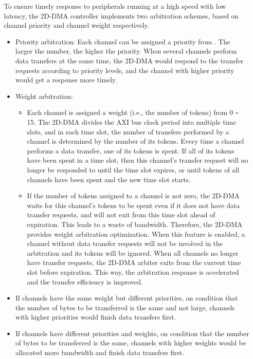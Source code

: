 \documentclass[main\_\_EN.tex]{subfiles}
\begin{document}
To ensure timely response to peripherals running at a high speed with low latency, the 2D-DMA controller implements two arbitration schemes, based on channel priority and channel weight respectively.

\begin{itemize}
    \item Priority arbitration: Each channel can be assigned a priority from . The larger the number, the higher the priority. When several channels perform data transfers at the same time, the 2D-DMA would respond to the transfer requests according to priority levels, and the channel with higher priority would get a response more timely.
    \item Weight arbitration:
        \begin{itemize}
            \item Each channel is assigned a weight (i.e., the number of tokens) from 0 \verb+~+ 15. The 2D-DMA divides the AXI bus clock period into multiple time slots, and in each time slot, the number of transfers performed by a channel is determined by the number of its tokens. Every time a channel performs a data transfer, one of its tokens is spent. If all of its tokens have been spent in a time slot, then this channel's transfer request will no longer be responded to until the time slot expires, or until tokens of all channels have been spent and the new time slot starts.
            \item If the number of tokens assigned to a channel is not zero, the 2D-DMA waits for this channel's tokens to be spent even if it does not have data transfer requests, and will not exit from this time slot ahead of expiration. This leads to a waste of bandwidth. Therefore, the 2D-DMA provides weight arbitration optimization. When this feature is enabled, a channel without data transfer requests will not be involved in the arbitration and its tokens will be ignored. When all channels no longer have transfer requests, the 2D-DMA arbiter exits from the current time slot before expiration. This way, the arbitration response is accelerated and the transfer efficiency is improved.
        \end{itemize}
\end{itemize}


\begin{tiplisting}
\vspace{-2em}
\begin{itemize}
    \item If channels have the same weight but different priorities, on condition that the number of bytes to be transferred is the same and not large, channels with higher priorities would finish data transfers first.
    \item If channels have different priorities and weights, on condition that the number of bytes to be transferred is the same, channels with higher weights would be allocated more bandwidth and finish data transfers first.
\end{itemize}
\end{tiplisting}
\end{document}
